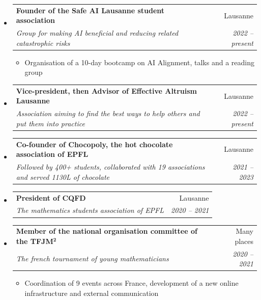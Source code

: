 \documentclass[letterpaper,11pt]{article}
\makeatletter
\newcommand{\Flag}[2]{%
  \scalebox{1}{%
    \scalebox{0}{#2}%
    \worldflag[width=0.32cm,framewidth=0px]{#1}}}
\newcommand{\CH}{\Flag{CH}{Switzerland}}
\newcommand{\FR}{\Flag{FR}{France}}
\newcommand{\resitem}[1]{\item #1 \vspace{-2pt}}
\newcommand{\ressubheading}[4]{
    \begin{tabular*}{6.5in}{l@{\cftdotfill{\cftsecdotsep}\extracolsep{\fill}}r}
      \textbf{#1} & #2 \\
      \textit{#3} & \textit{#4} \\
    \end{tabular*}\vspace{-8pt}}
\makeatother
\begin{document}
  \begin{itemize}
    \item
      \ressubheading{Founder of the Safe AI Lausanne student association}
        {Lausanne \CH}
        {Group for making AI beneficial and reducing related catastrophic risks}
        {2022 -- present}
      \begin{itemize}
        \resitem{Organisation of a 10-day bootcamp on AI Alignment, talks and a reading group}
      \end{itemize}

    \item
      \ressubheading{Vice-president, then Advisor of Effective Altruism Lausanne}
        {Lausanne \CH}
        {Association aiming to find the best ways to help others and put them into practice}
        {2022 -- present}

    \item
      \ressubheading{Co-founder of Chocopoly, the hot chocolate association of EPFL}
        {Lausanne \CH}
        {Followed by 400+ students, collaborated with 19 associations and served 1130L of chocolate}
        {2021 -- 2023}

    \item
      \ressubheading{President of CQFD}
        {Lausanne \CH}
        {The mathematics students association of EPFL}
        {2020 -- 2021}

    \item
      \ressubheading{Member of the national organisation committee of the TFJM$^\mathbf{2}$}
      {Many places \FR}
      {The french tournament of young mathematicians}
      {2020 -- 2021}
      \begin{itemize}
        \resitem{Coordination of 9 events across France, development of a new
          online infrastructure and external communication}
      \end{itemize}

  \end{itemize}
\end{document}
